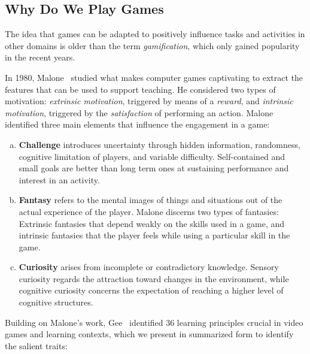 \subsection{Why Do We Play Games} \label{sec:gamification-principles:games}

The  idea that games can be adapted to positively influence tasks and activities in other domains is older than the term \emph{gamification}, which only gained popularity in the recent years.

In 1980, Malone~\cite{Malone1980} studied what makes computer games captivating to extract the features that can be used to support teaching.
He considered two types of motivation: \emph{extrinsic motivation}, triggered by means of a {\em reward}, and \emph{intrinsic motivation}, triggered by the {\em satisfaction} of performing an action.
Malone identified three main elements that influence the engagement in a game:

\begin{enumerate}[(a)]

\item\textbf{Challenge} introduces uncertainty through hidden information, randomness, cognitive limitation of players, and variable difficulty.
Self-contained and small goals are better than long term ones at sustaining performance and interest in an activity.

\item\textbf{Fantasy} refers to the mental images of things and situations out of the actual experience of the player.
Malone discerns two types of fantasies: Extrinsic fantasies that depend weakly on the skills used in a game, and intrinsic fantasies that the player feels while using a particular skill in the game.

\item\textbf{Curiosity} arises from incomplete or contradictory knowledge.
Sensory curiosity regards the attraction toward changes in the environment, while cognitive curiosity concerns the expectation of reaching a higher level of cognitive structures.

\end{enumerate}

Building on Malone's work, Gee~\cite{Gee2003} identified 36 learning principles crucial in video games and learning contexts, which we present in summarized form to identify the salient traits:

